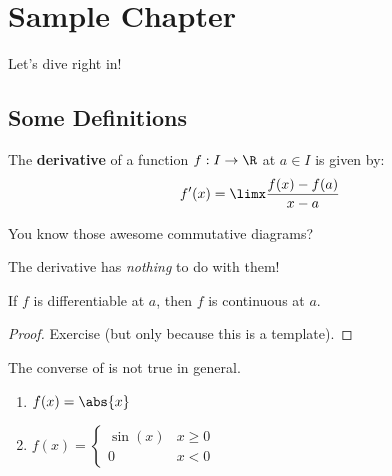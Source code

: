 \section{Sample Chapter}
Let's dive right in!

\subsection{Some Definitions}
\begin{definition}
The \textbf{derivative} of a function $f:I\to\R$ at $a\in I$ is given by:
\begin{equation*}
    f'(x)=\limx\frac{f(x)-f(a)}{x-a}
\end{equation*}
\end{definition}

\begin{center}
You know those awesome commutative diagrams?


The derivative has \emph{nothing} to do with them!
\end{center}

\begin{proposition}\label{diffcont}
If $f$ is differentiable at $a$, then $f$ is continuous at $a$.
\end{proposition}
\begin{proof}
Exercise (but only because this is a template).
\end{proof}

The converse of  is not true in general.

\begin{examples}\leavevmode %
\begin{enumerate}
    \item $f(x)=\abs{x}$
    \item $f(x)=\begin{cases} \sin(x) & x\ge 0 \\ 0 & x<0 \end{cases}$
\end{enumerate}
\end{examples}

